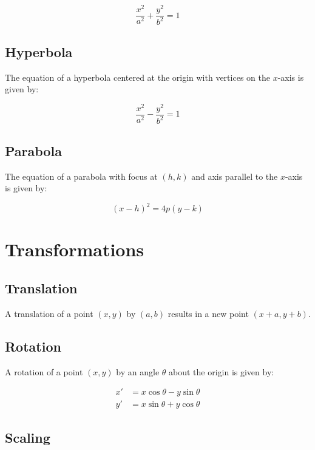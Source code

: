 \documentclass{article}
\begin{document}
\begin{equation}
    \frac{x^2}{a^2} + \frac{y^2}{b^2} = 1
\end{equation}

\subsection{Hyperbola}

The equation of a hyperbola centered at the origin with vertices on the $x$-axis is given by:

\begin{equation}
    \frac{x^2}{a^2} - \frac{y^2}{b^2} = 1
\end{equation}

\subsection{Parabola}

The equation of a parabola with focus at $(h, k)$ and axis parallel to the $x$-axis is given by:

\begin{equation}
    (x - h)^2 = 4p(y - k)
\end{equation}

\section{Transformations}

\subsection{Translation}

A translation of a point $(x, y)$ by $(a, b)$ results in a new point $(x + a, y + b)$.

\subsection{Rotation}

A rotation of a point $(x, y)$ by an angle $\theta$ about the origin is given by:

\begin{align}
    x' &= x \cos \theta - y \sin \theta \\
    y' &= x \sin \theta + y \cos \theta
\end{align}

\subsection{Scaling}
\end{document}
